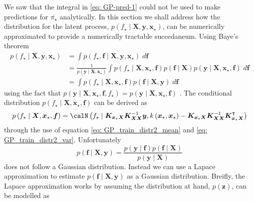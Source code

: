 We saw that the integral in \ref{eq: GP-pred-1} could not be used to make predictions for $\overline{\pi_{\star}}$ analytically. In this section we shall address how the distribution for the latent process, $p \left( f_{\star} \mid \bm{X} , \bm{y} , \bm{x}_{\star} \right)$, can be numerically approximated to provide a numerically tractable succedaneum. Using Baye's theorem
\begin{align*}
    p \left( f_{\star} \mid \bm{X} , \bm{y} , \bm{x}_{\star} \right)
     & = \int p \left( f_{\star} , \bm{f} \mid \bm{X} , \bm{y} , \bm{x}_{\star} \right) \; d \bm{f}                                                                                                                                                       \\
     & = \frac{1}{p \left( \bm{y} \mid \bm{X} , \bm{x}_{\star} \right)} \int p \left( f_{\star} \mid \bm{X} , \bm{x}_{\star}, \bm{f} \right) p \left( \bm{f} \mid \bm{X} \right) p \left( \bm{y} \mid \bm{X} , \bm{x}_{\star}, \bm{f} \right) \; d \bm{f} \\
     & = \int p \left( f_{\star} \mid \bm{X} , \bm{x}_{\star}, \bm{f} \right) p \left( \bm{f} \mid \bm{X} , \bm{y} \right) \; d \bm{f}
\end{align*}
using the fact that $p \left( \bm{y} \mid \bm{X} , \bm{x}_{\star}, \bm{f}, f_{\star} \right) = p \left( \bm{y} \mid \bm{X} , \bm{x}_{\star}, \bm{f} \right)$ \cite{BishopChristopherM2006Pram, RasmussenCarlEdward2006Gpfm}. The conditional distribution $p \left( f_{\star} \mid \bm{X} , \bm{x}_{\star}, \bm{f} \right)$ can be derived as
\begin{equation*}
    p \left( f_{\star} \mid \bm{X} , \bm{x}_{\star}, \bm{f} \right) = \calN \left( f_{\star} \mid \bm{K}_{\bm{x}_{\star}\bm{X}} \bm{K}_{\bm{X} \bm{X}}^{-1} \bm{y}, k \left( \bm{x}_{\star}, \bm{x}_{\star} \right) - \bm{K}_{\bm{x}_{\star}\bm{X}} \bm{K}_{\bm{X} \bm{X}}^{-1} \bm{K}_{\bm{x}_{\star} \bm{X}}^{\intercal} \right)
\end{equation*}
through the use of equation \ref{eq: GP_train_distr2_mean} and \ref{eq: GP_train_distr2_var}. Unfortunately
\begin{equation*}
    p \left( \bm{f} \mid \bm{X} , \bm{y} \right) = \frac{p \left( \bm{y} \mid \bm{f} \right) p \left( \bm{f} \mid \bm{X} \right) }{p \left( \bm{y} \mid \bm{X} \right)}
\end{equation*}
does not follow a Gaussian distribution. Instead we can use a Lapace approximation to estimate $p \left( \bm{f} \mid \bm{X} , \bm{y} \right)$ as a Gaussian distribution. Breifly, the Lapace approximation works by assuming the distribution at hand, $p \left( \bm{z} \right)$, can be modelled as
